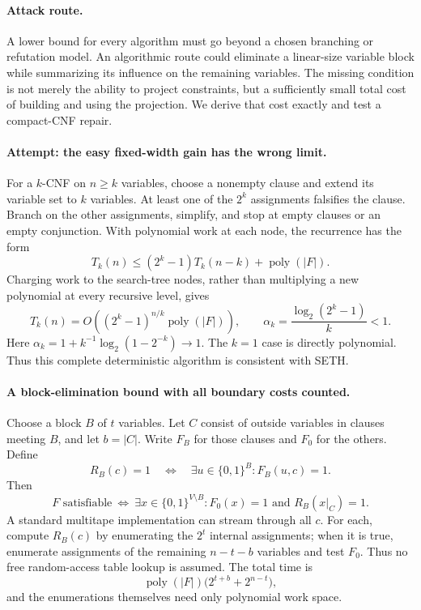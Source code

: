 \documentclass[11pt,a4paper]{article}
\numberwithin{equation}{section}
\begin{document}
\paragraph{Attack route.}
A lower bound for every algorithm must go beyond a chosen branching or refutation model. An algorithmic route could eliminate a linear-size variable block while summarizing its influence on the remaining variables. The missing condition is not merely the ability to project constraints, but a sufficiently small total cost of building and using the projection. We derive that cost exactly and test a compact-CNF repair.

\paragraph{Attempt: the easy fixed-width gain has the wrong limit.}
For a $k$-CNF on $n\ge k$ variables, choose a nonempty clause and extend its variable set to $k$ variables. At least one of the $2^k$ assignments falsifies the clause. Branch on the other assignments, simplify, and stop at empty clauses or an empty conjunction. With polynomial work at each node, the recurrence has the form
\[
 T_k(n)\le(2^k-1)T_k(n-k)+\operatorname{poly}(|F|).
\]
Charging work to the search-tree nodes, rather than multiplying a new polynomial at every recursive level, gives
\begin{equation}\label{r65:branch}
 T_k(n)=O\!\left((2^k-1)^{n/k}\operatorname{poly}(|F|)\right),\qquad
 \alpha_k=\frac{\log_2(2^k-1)}{k}<1.
\end{equation}
Here $\alpha_k=1+k^{-1}\log_2(1-2^{-k})\to1$. The $k=1$ case is directly polynomial. Thus this complete deterministic algorithm is consistent with SETH.

\paragraph{A block-elimination bound with all boundary costs counted.}
Choose a block $B$ of $t$ variables. Let $C$ consist of outside variables in clauses meeting $B$, and let $b=|C|$. Write $F_B$ for those clauses and $F_0$ for the others. Define
\[
 R_B(c)=1\quad\Longleftrightarrow\quad
       \exists u\in\{0,1\}^{B}:F_B(u,c)=1.
\]
Then
\begin{equation}\label{r65:projection}
 F\text{ satisfiable}\ \Longleftrightarrow\
 \exists x\in\{0,1\}^{V\setminus B}:F_0(x)=1\text{ and }R_B(x|_C)=1.
\end{equation}
A standard multitape implementation can stream through all $c$. For each, compute $R_B(c)$ by enumerating the $2^t$ internal assignments; when it is true, enumerate assignments of the remaining $n-t-b$ variables and test $F_0$. Thus no free random-access table lookup is assumed. The total time is
\begin{equation}\label{r65:cost}
 \operatorname{poly}(|F|)\bigl(2^{t+b}+2^{n-t}\bigr),
\end{equation}
and the enumerations themselves need only polynomial work space.
\end{document}
